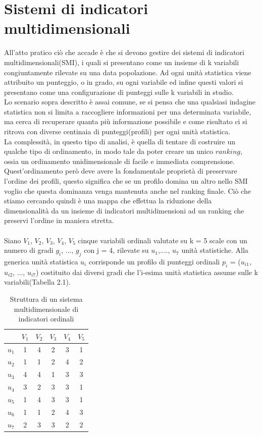 \documentclass[a4paper,12pt, openright]{report}
\begin{document}
\section{Sistemi di indicatori multidimensionali}

All'atto pratico ciò che accade è che si devono gestire dei sistemi di indicatori multidimensionali(SMI), i quali si presentano come un insieme di k variabili 
congiuntamente rilevate su una data popolazione. Ad ogni unità statistica viene attribuito un punteggio, o in grado, su ogni 
variabile ed infine questi valori si presentano come una configurazione di punteggi sulle k variabili in studio. \\
Lo scenario sopra descritto è assai comune, se si pensa che una qualsiasi indagine statistica non si limita a raccogliere informazioni per una 
determinata variabile, ma cerca di recuperare quanta più informazione possibile e come risultato ci si ritrova con diverse centinaia di 
punteggi(profili) per ogni unità statistica. \\
La complessità, in questo tipo di analisi, è quella di tentare di costruire un qualche tipo di ordinamento, in modo tale da poter creare un unico  $\textit{ranking}$, 
ossia un ordinamento unidimensionale di facile e immediata comprensione. Quest'ordinamento però deve avere la fondamentale proprietà di 
preservare l'ordine dei profili, questo significa che se un profilo domina un altro nello SMI voglio che questa dominanza venga
mantenuta anche nel ranking finale. Ciò che stiamo cercando quindi è una mappa che effettua la riduzione della dimensionalità da un insieme di 
indicatori multidimensioni ad un ranking che preservi l'ordine in maniera stretta. \\
\\
Siano $V_{1}$, $V_{2}$, $V_{3}$, $V_{4}$, $V_{5}$ cinque variabili ordinali valutate su k = 5 scale con un numero di gradi $g_{i}$, ..., $g_{j}$ con j = 4, 
rilevate su $u_{1}$,...., $u_{7}$ unità statistiche. Alla generica unità statistica $u_{i}$ corrisponde un profilo di punteggi ordinali 
$p_{i}$ = ($u_{i1}$, $u_{i2}$, ..., $u_{i7}$) costituito dai diversi gradi che l'i-esima unità statistica assume sulle k variabili(Tabella 2.1). \\
\begin{table}[h!]
    \centering
    \begin{tabular}{||c c c c c c||} 
     \hline
           & $V_{1}$ & $V_{2}$ & $V_{3}$ & $V_{4}$ & $V_{5}$ \\ [0.5ex] 
     \hline\hline
     $u_{1}$ & 1 & 4 & 2 & 3 & 1 \\ 
     $u_{2}$ & 1 & 1 & 2 & 4 & 2 \\
     $u_{3}$ & 4 & 4 & 1 & 3 & 3  \\
     $u_{4}$ & 3 & 2 & 3 & 3 & 1  \\
     $u_{5}$ & 1 & 4 & 3 & 3 & 1  \\ 
     $u_{6}$ & 1 & 1 & 2 & 4 & 3 \\
     $u_{7}$ & 2 & 3 & 3 & 2 & 2 \\ [1ex] 
     \hline
    \end{tabular}
    \caption{Struttura di un sistema multidimensionale di indicatori ordinali}
    \label{table:1}
\end{table}
\end{document}
